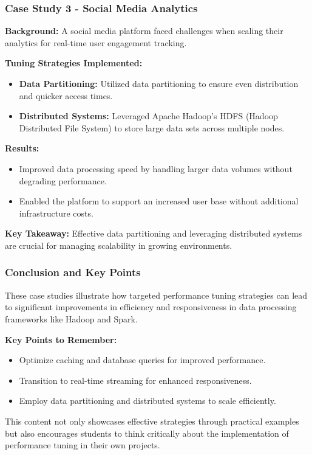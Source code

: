 \documentclass[aspectratio=169]{beamer}
\begin{document}
\begin{frame}[fragile]
    \frametitle{Case Study 3 - Social Media Analytics}
    \textbf{Background:}  
    A social media platform faced challenges when scaling their analytics for real-time user engagement tracking.

    \textbf{Tuning Strategies Implemented:}
    \begin{itemize}
        \item \textbf{Data Partitioning:} Utilized data partitioning to ensure even distribution and quicker access times.
        \item \textbf{Distributed Systems:} Leveraged Apache Hadoop's HDFS (Hadoop Distributed File System) to store large data sets across multiple nodes.
    \end{itemize}

    \textbf{Results:}
    \begin{itemize}
        \item Improved data processing speed by handling larger data volumes without degrading performance.
        \item Enabled the platform to support an increased user base without additional infrastructure costs.
    \end{itemize}

    \textbf{Key Takeaway:} Effective data partitioning and leveraging distributed systems are crucial for managing scalability in growing environments.
\end{frame}

\begin{frame}[fragile]
    \frametitle{Conclusion and Key Points}
    These case studies illustrate how targeted performance tuning strategies can lead to significant improvements in efficiency and responsiveness in data processing frameworks like Hadoop and Spark.

    \textbf{Key Points to Remember:}
    \begin{itemize}
        \item Optimize caching and database queries for improved performance.
        \item Transition to real-time streaming for enhanced responsiveness.
        \item Employ data partitioning and distributed systems to scale efficiently.
    \end{itemize}

    This content not only showcases effective strategies through practical examples but also encourages students to think critically about the implementation of performance tuning in their own projects.
\end{frame}
\end{document}
